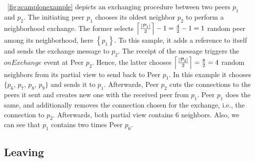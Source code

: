 \begin{asparadesc}
\item [Figure]~\ref{fig:scamplonexample} depicts an exchanging procedure
  between two peers $p_1$ and $p_2$. The initiating peer $p_1$ chooses its
  oldest neighbor $p_2$ to perform a neighborhood exchange. The former selects
  $\left\lceil{|\mathcal{P}_1|\over{2}}\right\rceil-1={4\over{2}}-1=1$ random
  peer among its neighborhood, here $\left\{p_1\right\}$. To this sample, it
  adds a reference to itself and sends the exchange message to $p_2$. The
  receipt of the message triggers the $onExchange$ event at Peer $p_2$. Hence,
  the latter chooses
  $\left\lceil{|\mathcal{P}_2|\over{2}}\right\rceil= {8\over{2}}=4$ random
  neighbors from its partial view to send back to Peer $p_1$. In this example
  it chooses $\{p_6,\,p_7,\,p_8,\,p_9\}$ and sends it to $p_1$. Afterwards,
  Peer $p_2$ cuts the connections to the peers it sent and creates new one with
  the received peer from $p_1$. Peer $p_1$ does the same, and additionally
  removes the connection chosen for the exchange, i.e., the connection to
  $p_2$. Afterwards, both partial view contains $6$ neighbors. Also, we can see
  that $p_1$ contains two times Peer $p_6$.
\end{asparadesc}

\begin{figure*}
  \centering
  
  \caption{\label{fig:scamplonexample} Examplary exchange between two peers
    using \SCAMPLON{}. In this case, Peer $p_1$ initiates an exchange with its
    oldest neighbor $p_2$ (for simplicity sake, only the partial view of the
    peers involved in the exchange are explicitly drawn). The network on the
    left shows the network before the exchange, and the network on the right
    shows the network after the exchange. After the exchange of peers chosen at
    random, both peers $p_1$ and $p_2$ have a partial view size of $6$.}
\end{figure*}

\subsection{Leaving}

\begin{algorithm}
  
  \caption{\label{algo:unreachable}The crash handler of \SCAMPLON{}.}
\end{algorithm}

